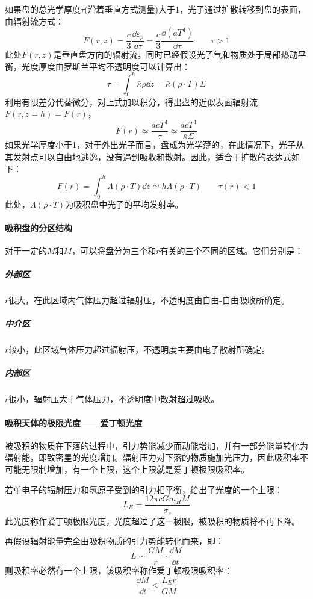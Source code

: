 如果盘的总光学厚度$\tau$(沿着垂直方式测量)大于1，光子通过扩散转移到盘的表面，由辐射流方式：
\begin{equation}
	F(r,z)=\frac{c}{3}\frac{\dd \varepsilon_{p}}{\dd \tau}=\frac{c}{3}\frac{\dd (aT^4)}{\dd \tau}\qquad \tau>1
\end{equation}
此处$F(r,z)$是垂直盘方向的辐射流。同时已经假设光子气和物质处于局部热动平衡，光度厚度由罗斯兰平均不透明度可以计算出：
\begin{equation}
	\tau=\int_{0}^{h}\bar{\kappa}\rho\dd z=\bar{\kappa}(\rho\cdot T)\varSigma
\end{equation}
利用有限差分代替微分，对上式加以积分，得出盘的近似表面辐射流$F(r,z=h)=F(r)$，
\begin{equation}
	F(r)\simeq\frac{acT^4}{\tau}\simeq\frac{acT^4}{\bar{\kappa}\varSigma}
\end{equation}
如果光学厚度小于1，对于外出光子而言，盘成为光学薄的，在此情况下，光子从其发射点可以自由地逃逸，没有遇到吸收和散射。因此，适合于扩散的表达式如下：
\begin{equation}
	F(r)=\int_{0}^{h}\varLambda(\rho\cdot T)\dd z\simeq h\varLambda(\rho\cdot T)\qquad \tau(r)<1
\end{equation}
此处，$\varLambda(\rho\cdot T)$为吸积盘中光子的平均发射率。
\paragraph{吸积盘的分区结构}
对于一定的$M$和$\dot{M}$，可以将盘分为三个和$r$有关的三个不同的区域。它们分别是：
\subparagraph{外部区}$r$很大，在此区域内气体压力超过辐射压，不透明度由自由-自由吸收所确定。
\subparagraph{中介区}$r$较小，此区域气体压力超过辐射压，不透明度主要由电子散射所确定。
\subparagraph{内部区}$r$很小，辐射压大于气体压力，不透明度中散射超过吸收。
\paragraph{吸积天体的极限光度——爱丁顿光度}
被吸积的物质在下落的过程中，引力势能减少而动能增加，并有一部分能量转化为辐射能，即致密星的光度增加。辐射压力对下落的物质施加光压力，因此吸积率不可能无限制增加，有一个上限，这个上限就是爱丁顿极限吸积率。

若单电子的辐射压力和氢原子受到的引力相平衡，给出了光度的一个上限：
\begin{equation}
	L_{E}=\frac{12\pi c Gm_{H}M}{\sigma_{e}}
\end{equation}
此光度称作爱丁顿极限光度，光度超过了这一极限，被吸积的物质将不再下降。

再假设辐射能量完全由吸积物质的引力势能转化而来，即：
\begin{equation}
	L\sim\frac{GM}{r}\cdot\frac{\dd M}{\dd t}
\end{equation}
则吸积率必然有一个上限，该吸积率称作爱丁顿极限吸积率：
\begin{equation}
	\frac{\dd M}{\dd t}\leq\frac{L_{E}r}{GM}
\end{equation}
